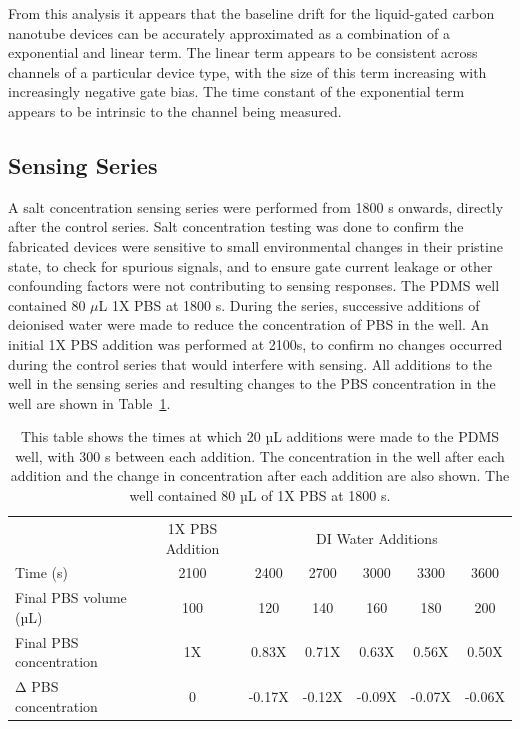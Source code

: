\documentclass[
  a4paper,
]{scrbook}
\begin{document}
From this analysis it appears that the baseline drift for the
liquid-gated carbon nanotube devices can be accurately approximated as a
combination of a exponential and linear term. The linear term appears to
be consistent across channels of a particular device type, with the size
of this term increasing with increasingly negative gate bias. The time
constant of the exponential term appears to be intrinsic to the channel
being measured.

\hypertarget{sec-salt-conc-series}{%
\subsection{Sensing Series}\label{sec-salt-conc-series}}

A salt concentration sensing series were performed from 1800 s onwards,
directly after the control series. Salt concentration testing was done
to confirm the fabricated devices were sensitive to small environmental
changes in their pristine state, to check for spurious signals, and to
ensure gate current leakage or other confounding factors were not
contributing to sensing responses. The PDMS well contained 80 \(\mu\)L
1X PBS at 1800 s. During the series, successive additions of deionised
water were made to reduce the concentration of PBS in the well. An
initial 1X PBS addition was performed at 2100s, to confirm no changes
occurred during the control series that would interfere with sensing.
All additions to the well in the sensing series and resulting changes to
the PBS concentration in the well are shown in
Table~\ref{tbl-salt-conc-series}.

\hypertarget{tbl-salt-conc-series}{}
\begin{table}
\caption{\label{tbl-salt-conc-series}This table shows the times at which 20 µL additions were made to the
PDMS well, with 300 s between each addition. The concentration in the
well after each addition and the change in concentration after each
addition are also shown. The well contained 80 µL of 1X PBS at 1800 s. }\tabularnewline

\centering
\begin{tabular}{lcccccc}
\toprule
\multicolumn{1}{c}{ } & \multicolumn{1}{c}{1X PBS Addition} & \multicolumn{5}{c}{DI Water Additions} \\
\cmidrule(l{3pt}r{3pt}){2-2} \cmidrule(l{3pt}r{3pt}){3-7}
Time (s) & 2100 & 2400 & 2700 & 3000 & 3300 & 3600\\
Final PBS volume (µL) & 100 & 120 & 140 & 160 & 180 & 200\\
Final PBS concentration & 1X & 0.83X & 0.71X & 0.63X & 0.56X & 0.50X\\
Δ PBS concentration & 0 & -0.17X & -0.12X & -0.09X & -0.07X & -0.06X\\
\bottomrule
\end{tabular}
\end{table}
\end{document}
